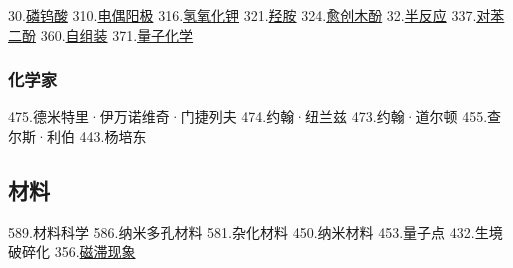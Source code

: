30.\href{https://wuli.wiki/assets/sogou/30.\%E7\%A3\%B7\%E9\%92\%A8\%E9\%85\%B8\%20-\%20\%E6\%90\%9C\%E7\%8B\%97\%E7\%A7\%91\%E5\%AD\%A6\%E7\%99\%BE\%E7\%A7\%91.html}{磷钨酸}
310.\href{https://wuli.wiki/assets/sogou/310.\%E7\%94\%B5\%E5\%81\%B6\%E9\%98\%B3\%E6\%9E\%81\%20-\%20\%E6\%90\%9C\%E7\%8B\%97\%E7\%A7\%91\%E5\%AD\%A6\%E7\%99\%BE\%E7\%A7\%91.html}{电偶阳极}
316.\href{https://wuli.wiki/assets/sogou/316.\%E6\%B0\%A2\%E6\%B0\%A7\%E5\%8C\%96\%E9\%92\%BE\%20-\%20\%E6\%90\%9C\%E7\%8B\%97\%E7\%A7\%91\%E5\%AD\%A6\%E7\%99\%BE\%E7\%A7\%91.html}{氢氧化钾}
321.\href{https://wuli.wiki/assets/sogou/321\%E7\%BE\%9F\%E8\%83\%BA\%20-\%20\%E6\%90\%9C\%E7\%8B\%97\%E7\%A7\%91\%E5\%AD\%A6\%E7\%99\%BE\%E7\%A7\%91.html}{羟胺}
324.\href{https://wuli.wiki/assets/sogou/324.\%E6\%84\%88\%E5\%88\%9B\%E6\%9C\%A8\%E9\%85\%9A\%20-\%20\%E6\%90\%9C\%E7\%8B\%97\%E7\%A7\%91\%E5\%AD\%A6\%E7\%99\%BE\%E7\%A7\%91.html}{愈创木酚}
32.\href{https://wuli.wiki/assets/sogou/32.\%E5\%8D\%8A\%E5\%8F\%8D\%E5\%BA\%94\%20-\%20\%E6\%90\%9C\%E7\%8B\%97\%E7\%A7\%91\%E5\%AD\%A6\%E7\%99\%BE\%E7\%A7\%91.html}{半反应}
337.\href{https://wuli.wiki/assets/sogou/337.\%E5\%AF\%B9\%E8\%8B\%AF\%E4\%BA\%8C\%E9\%85\%9A\%20-\%20\%E6\%90\%9C\%E7\%8B\%97\%E7\%A7\%91\%E5\%AD\%A6\%E7\%99\%BE\%E7\%A7\%91.html}{对苯二酚}
360.\href{https://wuli.wiki/assets/sogou/360.\%E8\%87\%AA\%E7\%BB\%84\%E8\%A3\%85\%20-\%20\%E6\%90\%9C\%E7\%8B\%97\%E7\%A7\%91\%E5\%AD\%A6\%E7\%99\%BE\%E7\%A7\%91.html}{自组装}
371.\href{https://wuli.wiki/assets/sogou/371.\%E9\%87\%8F\%E5\%AD\%90\%E5\%8C\%96\%E5\%AD\%A6\%20-\%20\%E6\%90\%9C\%E7\%8B\%97\%E7\%A7\%91\%E5\%AD\%A6\%E7\%99\%BE\%E7\%A7\%91.html}{量子化学}

\subsubsection{化学家}
475.德米特里·伊万诺维奇·门捷列夫
474.约翰·纽兰兹
473.约翰·道尔顿
455.查尔斯·利伯
443.杨培东
\subsection{材料}
589.材料科学
586.纳米多孔材料
581.杂化材料
450.纳米材料
453.量子点
432.生境破碎化
356.\href{https://wuli.wiki/assets/sogou/356.\%E7\%A3\%81\%E6\%BB\%9E\%E7\%8E\%B0\%E8\%B1\%A1\%20-\%20\%E6\%90\%9C\%E7\%8B\%97\%E7\%A7\%91\%E5\%AD\%A6\%E7\%99\%BE\%E7\%A7\%91.html}{磁滞现象}
